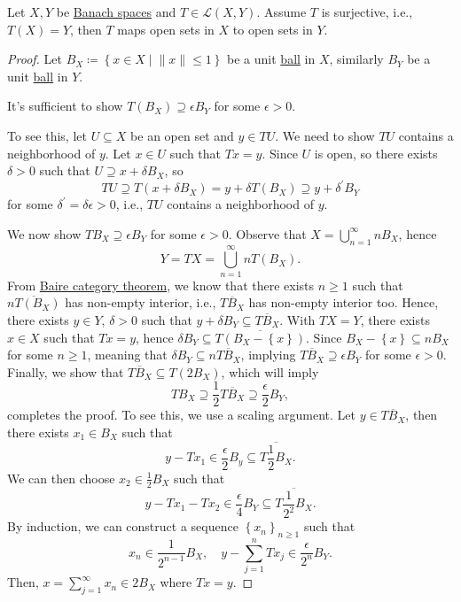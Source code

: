 \begin{theorem}\label{thm:open-mapping}
	Let \(X, Y\) be \hyperref[def:Banach-space]{Banach spaces} and \(T\in \mathcal{L} (X, Y)\). Assume \(T\) is surjective, i.e., \(T(X)= Y\), then \(T\) maps open sets in \(X\) to open sets in \(Y\).
\end{theorem}
\begin{proof}
	Let \(B_X \coloneqq \left\{ x\in X \mid \lVert x\rVert \leq 1 \right\} \) be a unit \hyperref[def:ball]{ball} in \(X\), similarly \(B_Y\) be a unit \hyperref[def:ball]{ball} in \(Y\).

	\begin{claim}
		It's sufficient to show \(T(B_X) \supseteq \epsilon B_Y\) for some \(\epsilon > 0\).
	\end{claim}
	\begin{explanation}
		To see this, let \(U \subseteq X\) be an open set and \(y\in TU\). We need to show \(TU\) contains a neighborhood of \(y\). Let \(x\in U\) such that \(Tx = y\). Since \(U\) is open, so there exists \(\delta > 0\) such that \(U \supseteq x + \delta B_X\), so
		\[
			TU \supseteq T(x + \delta B_X) = y + \delta T(B_X) \supseteq y + \delta ^\prime B_Y
		\]
		for some \(\delta ^\prime = \delta \epsilon > 0\), i.e., \(TU\) contains a neighborhood of \(y\).
	\end{explanation}

	We now show \(TB_X \supseteq \epsilon B_Y\) for some \(\epsilon > 0\). Observe that \(X = \bigcup_{n=1}^{\infty} n B_X\), hence
	\[
		Y = TX = \bigcup\limits_{n=1}^{\infty } n T(B_{X}).
	\]
	From \hyperref[prop:Baire-category]{Baire category theorem}, we know that there exists \(n \geq 1\) such that \(\overline{nT(B_X)}\) has non-empty interior, i.e., \(\overline{TB_X}\) has non-empty interior too. Hence, there exists \(y\in Y\), \(\delta > 0\) such that \(y + \delta B_Y \subseteq \overline{TB_X}\). With \(TX=Y\), there exists \(x\in X\) such that \(Tx = y\), hence \(\delta B_Y \subseteq \overline{T(B_X - \left\{ x \right\} )}\). Since \(B_X - \left\{ x \right\} \subseteq n B_X\) for some \(n \geq 1\), meaning that \(\delta B_Y \subseteq n \overline{TB_X}\), implying \(\overline{TB_X}\supseteq \epsilon B_Y\) for some \(\epsilon > 0\). Finally, we show that \(\overline{TB_X} \subseteq T(2 B_X)\), which will imply
	\[
		TB_X \supseteq \frac{1}{2}\overline{TB_X} \supseteq \frac{\epsilon}{2} B_Y,
	\]
	completes the proof. To see this, we use a scaling argument. Let \(y\in \overline{TB_X}\), then there exists \(x_1 \in B_X\) such that
	\[
		y-Tx_1 \in \frac{\epsilon}{2} B_y \subseteq \overline{T \frac{1}{2}B_X}.
	\]
	We can then choose \(x_2\in \frac{1}{2}B_X\) such that
	\[
		y-Tx_1 - Tx_2 \in \frac{\epsilon}{4}B_Y \subseteq \overline{T\frac{1}{2^2}B_X}.
	\]
	By induction, we can construct a sequence \(\left\{ x_n \right\}_{n\geq 1} \) such that
	\[
		x_n \in \frac{1}{2^{n-1}}B_X,\quad y- \sum_{j=1}^n Tx_j\in \frac{\epsilon}{2^n} B_Y.
	\]
	Then, \(x = \sum_{j=1} ^{\infty }x_n \in 2B_X\) where \(Tx = y\).
\end{proof}

